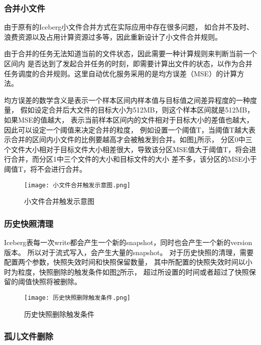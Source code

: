 \subsubsection{合并小文件}

由于原有的Iceberg小文件合并方式在实际应用中存在很多问题，
如合并不及时、浪费资源以及占用计算资源过多等，因此重新设计了小文件合并规则。

由于合并的任务无法知道当前的文件状态，因此需要一种计算规则来判断当前一个区间内
是否达到了发起合并任务的时刻，即需要计算出文件的状态，以作为合并任务调度的合并规则。这里自动优化服务采用的是均方误差（MSE）的计算方法。

均方误差的数学含义是表示一个样本区间内样本值与目标值之间差异程度的一种度量，
假如设定合并后大文件的目标大小为512MB，则这个样本区间就是512MB，如果MSE的值越大，
表示当前样本区间内的文件相对于目标大小的差值也越大，因此可以设定一个阈值来决定合并的粒度，
例如设置一个阈值T，当阈值T越大表示合并的区间内小文件的比例要越高才会被触发到合并。如图\ref{fig:小文件合并触发示意图}所示，
分区0中三个文件大小相对于目标文件大小相差很大，导致该分区MSE值大于阈值T，将会进行合并，而分区1中三个文件的大小和目标文件的大小
差不多，该分区的MSE小于阈值T，将不会进行合并。

\begin{figure}[H]
  \centering
  \texttt{[image: 小文件合并触发示意图.png]}
  \caption{小文件合并触发示意图}
  \label{fig:小文件合并触发示意图}
\end{figure}

\subsubsection{历史快照清理}

Iceberg表每一次write都会产生一个新的snapshot，同时也会产生一个新的version版本。
所以对于流式写入，会产生大量的snapshot。
对于历史快照的清理，需要配置两个参数，快照失效时间和快照保留数量，
其中所配置的快照失效时间以小时为粒度，快照删除的触发条件如图\ref{fig:历史快照删除触发条件}所示，
超过所设置的时间或者超过了快照保留的阈值快照将被删除。

\begin{figure}[H]
  \centering
  \texttt{[image: 历史快照删除触发条件.png]}
  \caption{历史快照删除触发条件}
  \label{fig:历史快照删除触发条件}
\end{figure}

\subsubsection{孤儿文件删除}

